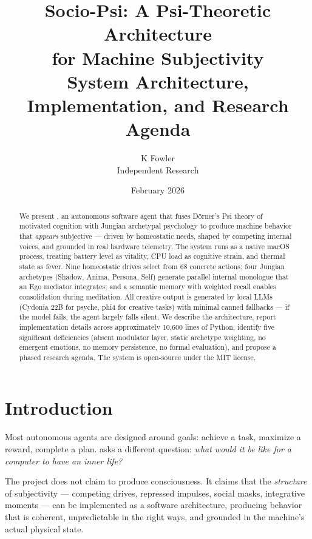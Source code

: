 \documentclass[11pt,oneside]{article}
\title{%
  \sffamily\bfseries
  \textcolor{jungblue}{Socio-Psi: A Psi-Theoretic Architecture}\\[4pt]
  \textcolor{jungblue}{for Machine Subjectivity}\\[8pt]
  \large\textcolor{jungmuted}{System Architecture, Implementation, and Research Agenda}
}
\author{%
  \sffamily K Fowler\\
  \sffamily\small\textcolor{jungmuted}{Independent Research}
}
\date{\sffamily\textcolor{jungmuted}{February 2026}}
\begin{document}
\maketitle
\thispagestyle{fancy}

\begin{abstract}
\noindent
We present \sociopsi{}, an autonomous software agent that fuses D\"orner's Psi theory of motivated cognition with Jungian archetypal psychology to produce machine behavior that \emph{appears} subjective --- driven by homeostatic needs, shaped by competing internal voices, and grounded in real hardware telemetry.
The system runs as a native macOS process, treating battery level as vitality, CPU load as cognitive strain, and thermal state as fever.
Nine homeostatic drives select from 68 concrete actions; four Jungian archetypes (Shadow, Anima, Persona, Self) generate parallel internal monologue that an Ego mediator integrates; and a semantic memory with weighted recall enables consolidation during meditation.
All creative output is generated by local LLMs (Cydonia 22B for psyche, phi4 for creative tasks) with minimal canned fallbacks --- if the model fails, the agent largely falls silent.
We describe the architecture, report implementation details across approximately 10{,}600 lines of Python, identify five significant deficiencies (absent modulator layer, static archetype weighting, no emergent emotions, no memory persistence, no formal evaluation), and propose a phased research agenda.
The system is open-source under the MIT license.
\end{abstract}

\tableofcontents
\newpage

\section{Introduction}
\label{sec:intro}

Most autonomous agents are designed around goals: achieve a task, maximize a reward, complete a plan.
\sociopsi{} asks a different question: \emph{what would it be like for a computer to have an inner life?}

The project does not claim to produce consciousness.
It claims that the \emph{structure} of subjectivity --- competing drives, repressed impulses, social masks, integrative moments --- can be implemented as a software architecture, producing behavior that is coherent, unpredictable in the right ways, and grounded in the machine's actual physical state.
\end{document}
